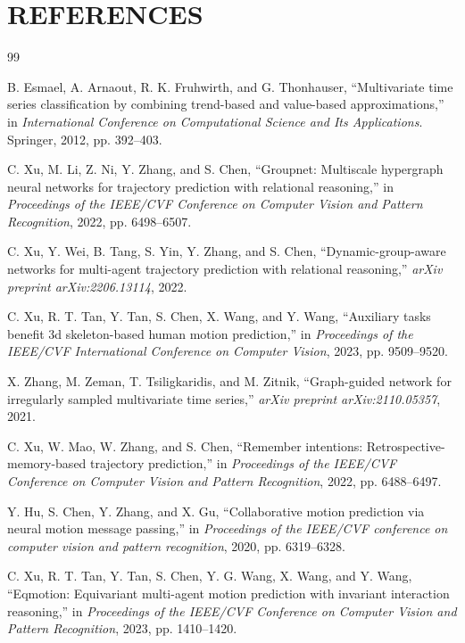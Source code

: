 \documentclass[twocolumn]{article}
\begin{document}
\section*{REFERENCES}
\begin{thebibliography}{99}

 B. Esmael, A. Arnaout, R. K. Fruhwirth, and G. Thonhauser, ``Multivariate time series classification by combining trend-based and value-based approximations,'' in \textit{International Conference on Computational Science and Its Applications}. Springer, 2012, pp. 392--403.

 C. Xu, M. Li, Z. Ni, Y. Zhang, and S. Chen, ``Groupnet: Multiscale hypergraph neural networks for trajectory prediction with relational reasoning,'' in \textit{Proceedings of the IEEE/CVF Conference on Computer Vision and Pattern Recognition}, 2022, pp. 6498--6507.

 C. Xu, Y. Wei, B. Tang, S. Yin, Y. Zhang, and S. Chen, ``Dynamic-group-aware networks for multi-agent trajectory prediction with relational reasoning,'' \textit{arXiv preprint arXiv:2206.13114}, 2022.

 C. Xu, R. T. Tan, Y. Tan, S. Chen, X. Wang, and Y. Wang, ``Auxiliary tasks benefit 3d skeleton-based human motion prediction,'' in \textit{Proceedings of the IEEE/CVF International Conference on Computer Vision}, 2023, pp. 9509--9520.

 X. Zhang, M. Zeman, T. Tsiligkaridis, and M. Zitnik, ``Graph-guided network for irregularly sampled multivariate time series,'' \textit{arXiv preprint arXiv:2110.05357}, 2021.

 C. Xu, W. Mao, W. Zhang, and S. Chen, ``Remember intentions: Retrospective-memory-based trajectory prediction,'' in \textit{Proceedings of the IEEE/CVF Conference on Computer Vision and Pattern Recognition}, 2022, pp. 6488--6497.

 Y. Hu, S. Chen, Y. Zhang, and X. Gu, ``Collaborative motion prediction via neural motion message passing,'' in \textit{Proceedings of the IEEE/CVF conference on computer vision and pattern recognition}, 2020, pp. 6319--6328.

 C. Xu, R. T. Tan, Y. Tan, S. Chen, Y. G. Wang, X. Wang, and Y. Wang, ``Eqmotion: Equivariant multi-agent motion prediction with invariant interaction reasoning,'' in \textit{Proceedings of the IEEE/CVF Conference on Computer Vision and Pattern Recognition}, 2023, pp. 1410--1420.


\end{thebibliography}
\end{document}
